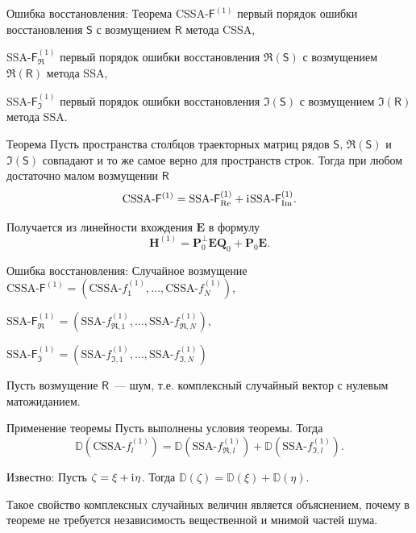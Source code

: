 \documentclass[ucs, notheorems, handout]{beamer}
\newcommand{\tX}[1]{\mathsf{#1}}
\newcommand{\iu}{\mathrm{i}\mkern1mu}
\begin{document}
\begin{frame}{Ошибка восстановления: Теорема}
    CSSA-$\tX{F}^{(1)}$ первый порядок ошибки восстановления $\tX{S}$ с возмущением $\tX{R}$ метода CSSA,

    SSA-$\tX{F}^{(1)}_{\Re}$ первый порядок ошибки восстановления $\Re(\tX{S})$ с возмущением $\Re(\tX{R})$ метода SSA,

    SSA-$\tX{F}^{(1)}_{\Im}$ первый порядок ошибки восстановления $\Im(\tX{S})$ с возмущением $\Im(\tX{R})$ метода SSA.

    \begin{block}{Теорема \label{th:sum}}
        Пусть пространства столбцов траекторных матриц рядов $\tX{S}$, $\Re(\tX{S})$ и $\Im(\tX{S})$ совпадают и то же самое верно для пространств строк.
    Тогда при любом достаточно малом возмущении $\tX{R}$
    $$\text{CSSA-}\tX{F}^{(1)} = \text{SSA-}\tX{F}^{(1)}_{\Re} + \iu\text{SSA-}\tX{F}^{(1)}_{\Im}.$$
    \end{block}
    Получается из линейности вхождения $\mathbf{E}$ в формулу
    $$\mathbf{H}^{(1)} = \mathbf{P}^{\perp}_0 \mathbf{E} \mathbf{Q}_0 + \mathbf{P}_0 \mathbf{E}.$$
\end{frame}

\begin{frame}{Ошибка восстановления: Случайное возмущение}
$\text{CSSA-}\tX{F}^{(1)} = (\text{CSSA-}f^{(1)}_1, \ldots, \text{CSSA-}f^{(1)}_N)$,

$\text{SSA-}\tX{F}^{(1)}_{\Re} = (\text{SSA-}f^{(1)}_{\Re, 1}, \ldots, \text{SSA-}f^{(1)}_{\Re, N})$,

$\text{SSA-}\tX{F}^{(1)}_{\Im} = (\text{SSA-}f^{(1)}_{\Im, 1}, \ldots, \text{SSA-}f^{(1)}_{\Im, N})$\\
\vspace{1em}

Пусть возмущение $\tX{R}$~--- шум, т.е. комплексный случайный вектор с нулевым матожиданием.\\
\vspace{1em}
\begin{block}{Применение теоремы}
Пусть выполнены условия теоремы.
Тогда
\begin{equation*} \label{eq:dispsum}
\mathbb{D}(\text{CSSA-}f^{(1)}_l) = \mathbb{D}(\text{SSA-}f^{(1)}_{\Re, l}) + \mathbb{D}(\text{SSA-}f^{(1)}_{\Im, l}).	
\end{equation*}
\end{block}

\alert{Известно:} Пусть $\zeta = \xi + \iu\eta$. Тогда $\mathbb{D}(\zeta) = \mathbb{D}(\xi) + \mathbb{D}(\eta)$.

Такое свойство комплексных случайных величин является объяснением, почему в теореме не требуется независимость вещественной и мнимой частей шума.
\end{frame}
\end{document}
